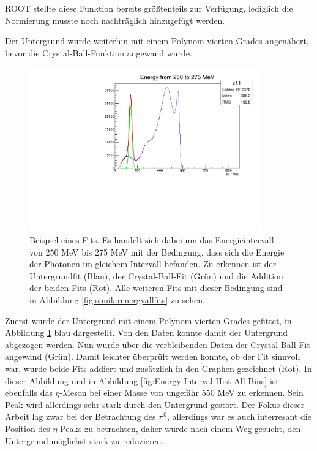 \documentclass[a4paper,11pt,oneside,final,german,openbib,pdftex]{scrbook}
\begin{document}
{ ROOT stellte diese Funktion bereits gr\"o{\ss}tenteils zur Verf\"ugung, lediglich die Normierung musste noch nachtr\"aglich hinzugef\"ugt werden.
 
 Der Untergrund wurde weiterhin mit einem Polynom vierten Grades angen\"ahert, bevor die Crystal-Ball-Funktion angewand wurde.
 
 \begin{figure}[h!]
 	\begin{center}
 		\includegraphics[width=100mm]{20172803SynnetricCBFFitExample}
 		
 		\caption{Beispiel eines Fits. Es handelt sich dabei um das Energieintervall von 250 MeV bis 275 MeV mit der Bedingung, dass sich die Energie der Photonen im gleichem Intervall befanden.
 			Zu erkennen ist der Untergrundfit (Blau), der Crystal-Ball-Fit (Gr\"un) und die Addition der beiden Fits (Rot). Alle weiteren Fits mit dieser Bedingung sind in Abbildung \ref{fig:similarenergyallfits} zu sehen.
 		}
 		\label{fig:fitexampleenergyinterval0903}	
 	\end{center}
 \end{figure}
 
  Zuerst wurde der Untergrund mit einem Polynom vierten Grades gefittet, in Abbildung \ref{fig:fitexampleenergyinterval0903} blau dargestellt. Von den Daten konnte damit der Untergrund abgezogen werden. Nun wurde \"uber die verbleibenden Daten der Crystal-Ball-Fit angewand (Gr\"un). Damit leichter \"uberpr\"uft werden konnte, ob der Fit sinnvoll war, wurde beide Fits addiert und zus\"atzlich in den Graphen gezeichnet (Rot). In dieser Abbildung  und in Abbildung \ref{fig:Energy-Interval-Hist-All-Bins} ist ebenfalls das $\eta$-Meson bei einer Masse von ungef\"ahr 550 MeV zu erkennen. Sein Peak wird allerdings sehr stark durch den Untergrund gest\"ort. Der Fokus dieser Arbeit lag zwar bei der Betrachtung des $\pi^0$, allerdings war es auch interresant die Position des $\eta$-Peaks zu betrachten, daher wurde nach einem Weg gesucht, den Untergrund m\"oglichst stark zu reduzieren. 
  
}
\end{document}
